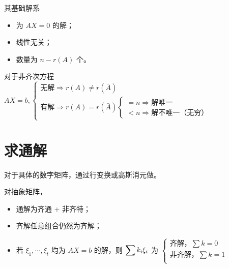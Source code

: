 其基础解系
\begin{itemize}
    \item 为 $ AX = 0 $ 的解；
    \item 线性无关；
    \item 数量为 $ n - r(A) $ 个。
\end{itemize}

对于非齐次方程 $ AX = b,\begin{cases}
    \textrm{无解}\Rightarrow r(A) \neq r(\bar A)\\ 
    \textrm{有解}\Rightarrow r(A) = r(\bar A)
    \begin{cases}
         = n \Rightarrow \textrm{解唯一}\\ 
         < n \Rightarrow \textrm{解不唯一（无穷）}
    \end{cases}
\end{cases} $ 

\section{求通解}

对于具体的数字矩阵，通过行变换或高斯消元做。

对抽象矩阵，
\begin{itemize}
    \item 通解为齐通 + 非齐特；
    \item 齐解任意组合仍然为齐解；
    \item 若 $ \xi_1,\cdots,\xi_t $ 均为 $ AX = b $ 的解，则
    $ \displaystyle \sum k_i\xi_i $ 为 $ \begin{cases}
        \textrm{齐解，} \sum k = 0 \\
        \textrm{非齐解，} \sum k = 1 \\
    \end{cases} $ 
\end{itemize}